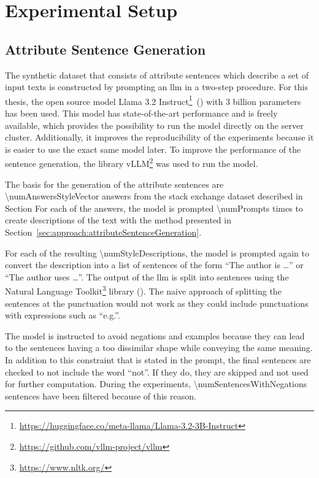 
\section{Experimental Setup}
\label{sec:experiments:setup}


\subsection{Attribute Sentence Generation}
\label{sec:experiments:setup:sentenceGeneration}
The synthetic dataset that consists of attribute sentences which describe a set of input texts is constructed by prompting an \acs{llm} in a two-step procedure. For this thesis, the open source model Llama 3.2 Instruct\footnote{\url{https://huggingface.co/meta-llama/Llama-3.2-3B-Instruct}}~(\cite{dubeyLlama3Herd2024}) with \num{3} billion parameters has been used. This model has state-of-the-art performance and is freely available, which provides the possibility to run the model directly on the server cluster. Additionally, it improves the reproducibility of the experiments because it is easier to use the exact same model later.
To improve the performance of the sentence generation, the library vLLM\footnote{\url{https://github.com/vllm-project/vllm}} was used to run the model.

The basis for the generation of the attribute sentences are \num{\numAnswersStyleVector} answers from the stack exchange dataset described in Section %
For each of the answers, the model is prompted \num{\numPrompts} times to create descriptions of the text with the method presented in Section~\ref{sec:approach:attributeSentenceGeneration}.

For each of the resulting \num{\numStyleDescriptions}, the model is prompted again to convert the description into a list of sentences of the form \enquote{The author is \ldots} or \enquote{The author uses \ldots}. The output of the \ac{llm} is split into sentences using the Natural Language Toolkit\footnote{\url{https://www.nltk.org/}} library (\cite{birdNaturalLanguageProcessing2009}). The naive approach of splitting the sentences at the punctuation would not work as they could include punctuations with expressions such as \enquote{e.g.}.

The model is instructed to avoid negations and examples because they can lead to the sentences having a too dissimilar shape while conveying the same meaning. In addition to this constraint that is stated in the prompt, the final sentences are checked to not include the word \enquote{not}. If they do, they are skipped and not used for further computation. During the experiments, \num{\numSentencesWithNegations} sentences have been filtered because of this reason.

